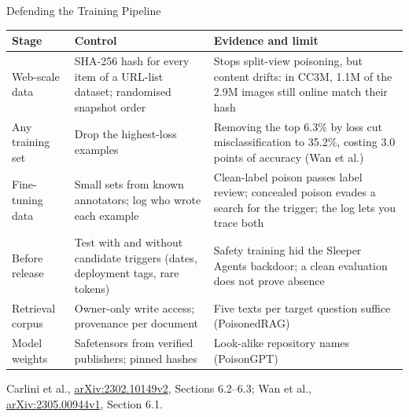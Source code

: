 \begin{frame}{Defending the Training Pipeline}
  \centering
  {\scriptsize
  \begin{tabular}{>{\raggedright\arraybackslash}p{1.8cm} >{\raggedright\arraybackslash}p{4.6cm} >{\raggedright\arraybackslash}p{6.0cm}}
    \toprule
    \textbf{Stage} & \textbf{Control} & \textbf{Evidence and limit} \\
    \midrule
    Web-scale data & SHA-256 hash for every item of a URL-list dataset; randomised snapshot order & Stops split-view poisoning, but content drifts: in CC3M, 1.1M of the 2.9M images still online match their hash \\
    \addlinespace[0.2em]
    Any training set & Drop the highest-loss examples & Removing the top 6.3\% by loss cut misclassification to 35.2\%, costing 3.0 points of accuracy (Wan et al.) \\
    \addlinespace[0.2em]
    Fine-tuning data & Small sets from known annotators; log who wrote each example & Clean-label poison passes label review; concealed poison evades a search for the trigger; the log lets you trace both \\
    \addlinespace[0.2em]
    Before release & Test with and without candidate triggers (dates, deployment tags, rare tokens) & Safety training hid the Sleeper Agents backdoor; a clean evaluation does not prove absence \\
    \addlinespace[0.2em]
    Retrieval corpus & Owner-only write access; provenance per document & Five texts per target question suffice (PoisonedRAG) \\
    \addlinespace[0.2em]
    Model weights & Safetensors from verified publishers; pinned hashes & Look-alike repository names (PoisonGPT) \\
    \bottomrule
  \end{tabular}\par}
  \vspace{0.3em}
  {\scriptsize Carlini et al., \href{https://arxiv.org/abs/2302.10149v2}{arXiv:2302.10149v2}, Sections 6.2--6.3; Wan et al., \href{https://arxiv.org/abs/2305.00944v1}{arXiv:2305.00944v1}, Section 6.1.}
\end{frame}
